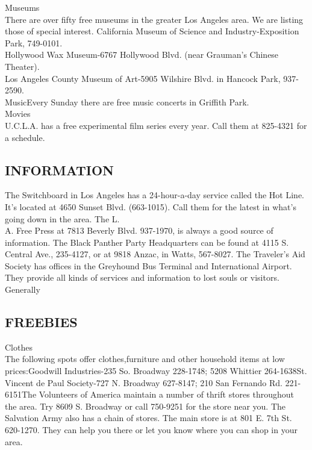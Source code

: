 \documentclass[11pt,twoside,a4paper]{book}
\begin{document}
Museums~\\
There are over fifty free museums in the greater Los Angeles area. We are listing those of special interest. California Museum of Science and Industry-Exposition Park, 749-0101.~\\

Hollywood Wax Museum-6767 Hollywood Blvd. (near Grauman's Chinese Theater).~\\

Los Angeles County Museum of Art-5905 Wilshire Blvd. in Hancock Park, 937-2590.~\\

MusicEvery Sunday there are free music concerts in Griffith Park.~\\

Movies~\\
U.C.L.A. has a free experimental film series every year. Call them at 825-4321 for a schedule.~\\

\subsection{INFORMATION}
The Switchboard in Los Angeles has a 24-hour-a-day service called the Hot Line. It's located at 4650 Sunset Blvd. (663-1015). Call them for the latest in what's going down in the area.  The L.~\\

A. Free Press at 7813 Beverly Blvd. 937-1970, is always a good source of information. The Black Panther Party Headquarters can be found at 4115 S. Central Ave., 235-4127, or at 9818 Anzac, in Watts, 567-8027. The Traveler's Aid Society has offices in the Greyhound Bus Terminal and International Airport. They provide all kinds of services and information to lost souls or visitors. Generally~\\

\subsection{FREEBIES}
Clothes~\\
The following spots offer clothes,furniture and other household items at low prices:Goodwill Industries-235 So. Broadway 228-1748; 5208 Whittier 264-1638St. Vincent de Paul Society-727 N. Broadway 627-8147; 210 San Fernando Rd. 221-6151The Volunteers of America maintain a number of thrift stores throughout the area. Try 8609 S. Broadway or call 750-9251 for the store near you. The Salvation Army also has a chain of stores. The main store is at 801 E. 7th St. 620-1270. They can help you there or let you know where you can shop in your area.~\\
\end{document}
